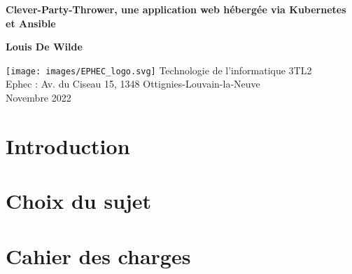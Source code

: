 \documentclass[12pt]{article}
\begin{document}
    \begin{titlepage}
        \begin{center}
            \vspace*{1cm}

            \Huge
            \textbf{Clever-Party-Thrower, une application web hébergée via Kubernetes et Ansible}

            \vspace{0.5cm}

            \vspace{1.5cm}

            \textbf{Louis De Wilde}

            \vfill

            \texttt{[image: images/EPHEC\_logo.svg]}
            \vfill
            \vspace{0.8cm}
            \Large
            Technologie de l'informatique 3TL2 \\
            Ephec : Av. du Ciseau 15, 1348 Ottignies-Louvain-la-Neuve\\
            Novembre 2022

        \end{center}
    \end{titlepage}
    \thispagestyle{empty}
    \newpage
    \setcounter{page}{0}
    \begin{KeepFromToc}
        \tableofcontents
    \end{KeepFromToc}
    \newpage
    \section{Introduction}\label{sec:introduction}
    
    \newpage

    \section{Choix du sujet}\label{subsec:choix-du-sujet}
    
    \newpage

    \section{Cahier des charges}\label{sec:cahier-des-charges}
    
    \newpage
\end{document}
